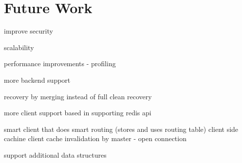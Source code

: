 \chapter{Future Work}
\label{chapter:future.work}

improve security

scalability

performance improvements - profiling

more backend support

recovery by merging instead of full clean recovery

more client support based in supporting redis api

smart client that does smart routing (stores and uses routing table)
  client side cachine
  client cache invalidation by master - open connection
  

support additional data structures

